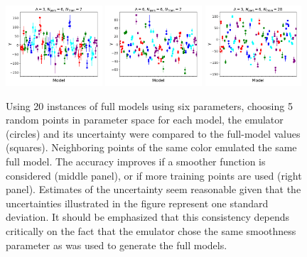 \documentclass[UserManual.tex]{subfiles}
\begin{document}
\begin{figure}
\includegraphics[width=0.32\textwidth]{sixpars/NPars6_Lambda3_NTrain7}\hspace*{0.02\textwidth}
\includegraphics[width=0.32\textwidth]{sixpars/NPars6_Lambda6_NTrain7}\hspace*{0.02\textwidth}
\includegraphics[width=0.32\textwidth]{sixpars/NPars6_Lambda3_NTrain28}
\caption{\label{fig:sixpars}
Using 20 instances of full models using six parameters, choosing 5 random points in parameter space for each model, the emulator (circles) and its uncertainty were compared to the full-model values (squares). Neighboring points of the same color emulated the same full model. The accuracy improves if a smoother function is considered (middle panel), or if more training points are used (right panel). Estimates of the uncertainty seem reasonable given that the uncertainties illustrated in the figure represent one standard deviation. It should be emphasized that this consistency depends critically on the fact that the emulator chose the same smoothness parameter as was used to generate the full models.
}
\end{figure}
\end{document}
